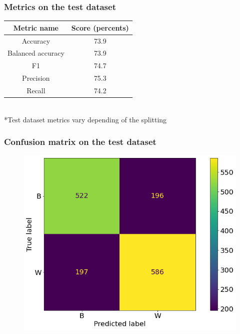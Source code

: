 \documentclass{beamer}
\begin{document}
\begin{frame}
\frametitle{Metrics on the test dataset}

\begin{center}
\begin{tabular}{ | c | c | } 
  \hline
Metric name & Score (percents) \\ 
  \hline
Accuracy & 73.9 \\ 
  \hline
Balanced accuracy & 73.9  \\ 
  \hline
F1 & 74.7  \\ 
  \hline
Precision & 75.3  \\ 
  \hline
Recall & 74.2 \\ 
  \hline
\end{tabular}
\\
*Test dataset metrics vary depending of the splitting
\end{center}

\end{frame}


\begin{frame}
\frametitle{Confusion matrix on the test dataset}

\begin{figure}
	\centering
	\includegraphics[scale=0.4]{images/confusion_matrix_td.png}
\end{figure}


\end{frame}
\end{document}
